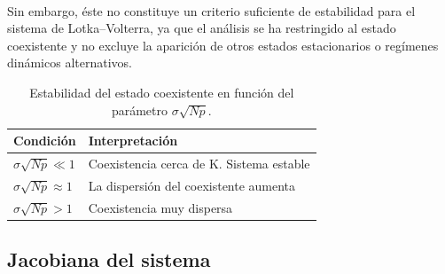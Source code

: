 \\
Sin embargo, éste no constituye un criterio suficiente de estabilidad para el sistema de Lotka--Volterra, ya que el análisis se ha restringido al estado coexistente y no excluye la aparición de otros estados estacionarios o regímenes dinámicos alternativos.
\begin{table}[h!]
	\centering
	\begin{tabular}{ll}
		\toprule
		\rowcolor{gray!15}
		Condición & Interpretación\\
		\midrule
		$\sigma\sqrt{Np}\ll 1$        & Coexistencia cerca de $\mathrm{K}$. Sistema estable\\
		$\sigma\sqrt{Np}\approx 1$    & La dispersión del coexistente aumenta\\
		$\sigma\sqrt{Np}>1$ 	   	  & Coexistencia muy dispersa\\
		\bottomrule
	\end{tabular}
	\caption{Estabilidad del estado coexistente en función del parámetro $\sigma\sqrt{Np}$.}
	\label{tab:lambdaMay}
\end{table}


\subsection{Jacobiana del sistema}

